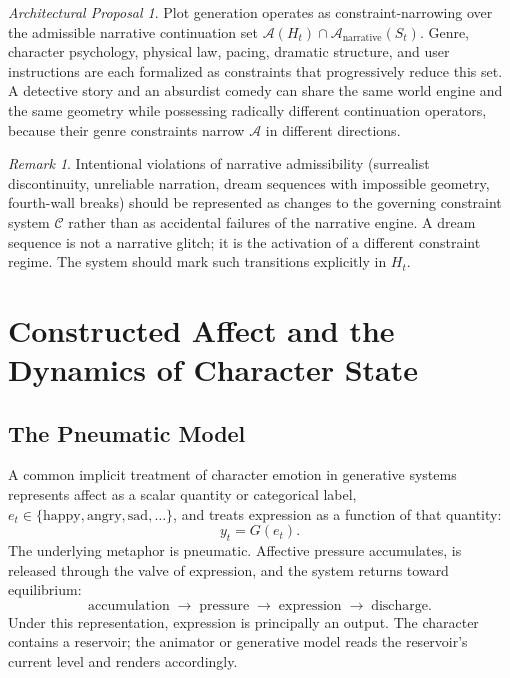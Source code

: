 \documentclass[11pt,a4paper]{article}
\theoremstyle{plain}
\theoremstyle{definition}
\theoremstyle{remark}
\newtheorem{remark}[theorem]{Remark}
\newtheorem{proposal}[theorem]{Architectural Proposal}
\begin{document}
\begin{proposal}
Plot generation operates as constraint-narrowing over the admissible narrative continuation set $\mathcal{A}(H_t) \cap \mathcal{A}_{\mathrm{narrative}}(S_t)$. Genre, character psychology, physical law, pacing, dramatic structure, and user instructions are each formalized as constraints that progressively reduce this set. A detective story and an absurdist comedy can share the same world engine and the same geometry while possessing radically different continuation operators, because their genre constraints narrow $\mathcal{A}$ in different directions.
\end{proposal}

\begin{remark}
Intentional violations of narrative admissibility (surrealist discontinuity, unreliable narration, dream sequences with impossible geometry, fourth-wall breaks) should be represented as changes to the governing constraint system $\mathcal{C}$ rather than as accidental failures of the narrative engine. A dream sequence is not a narrative glitch; it is the activation of a different constraint regime. The system should mark such transitions explicitly in $H_t$.
\end{remark}

\section{Constructed Affect and the Dynamics of Character State}
\label{sec:affect}

\subsection{The Pneumatic Model}

A common implicit treatment of character emotion in generative systems represents affect as a scalar quantity or categorical label, $e_t \in \{\text{happy},\allowbreak \text{angry},\allowbreak \text{sad},\allowbreak \ldots\}$, and treats expression as a function of that quantity:
\[
y_t = G(e_t).
\]
The underlying metaphor is pneumatic. Affective pressure accumulates, is released through the valve of expression, and the system returns toward equilibrium:
\[
\text{accumulation} \;\to\; \text{pressure} \;\to\; \text{expression} \;\to\; \text{discharge}.
\]
Under this representation, expression is principally an output. The character contains a reservoir; the animator or generative model reads the reservoir's current level and renders accordingly.
\end{document}
